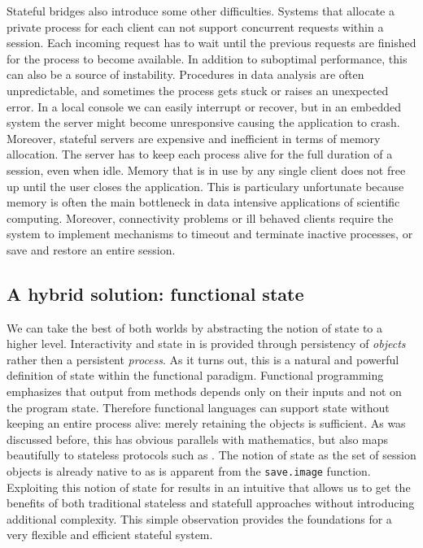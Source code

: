 Stateful bridges also introduce some other difficulties. Systems that allocate a private \R process for each client can not support concurrent requests within a session. Each incoming request has to wait until the previous requests are finished for the process to become available. In addition to suboptimal performance, this can also be a source of instability. Procedures in data analysis are often unpredictable, and sometimes the \R process gets stuck or raises an unexpected error. In a local console we can easily interrupt or recover, but in an embedded system the server might become unresponsive causing the application to crash. Moreover, stateful servers are expensive and inefficient in terms of memory allocation. The server has to keep each \R process alive for the full duration of a session, even when idle. Memory that is in use by any single client does not free up until the user closes the application. This is particulary unfortunate because memory is often the main bottleneck in data intensive applications of scientific computing. Moreover, connectivity problems or ill behaved clients require the system to implement mechanisms to timeout and terminate inactive processes, or save and restore an entire session.

\subsection{A hybrid solution: functional state}

We can take the best of both worlds by abstracting the notion of state to a higher level. Interactivity and state in \OpenCPU is provided through persistency of \emph{objects} rather then a persistent \emph{process}. As it turns out, this is a natural and powerful definition of state within the functional paradigm. Functional programming emphasizes that output from methods depends only on their inputs and not on the program state. Therefore functional languages can support state without keeping an entire process alive: merely retaining the objects is sufficient. As was discussed before, this has obvious parallels with mathematics, but also maps beautifully to stateless protocols such as \HTTP. The notion of state as the set of session objects is already native to \R as is apparent from the \texttt{save.image} function. Exploiting this notion of state for \RPC results in an intuitive \API that allows us to get the benefits of both traditional stateless and statefull approaches without introducing additional complexity. This simple observation provides the foundations for a very flexible and efficient stateful \RPC system.

